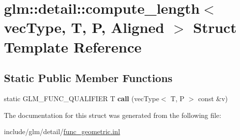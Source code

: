 \hypertarget{structglm_1_1detail_1_1compute__length}{}\section{glm\+:\+:detail\+:\+:compute\+\_\+length$<$ vec\+Type, T, P, Aligned $>$ Struct Template Reference}
\label{structglm_1_1detail_1_1compute__length}
\subsection*{Static Public Member Functions}
\begin{DoxyCompactItemize}
\item 
\mbox{\label{structglm_1_1detail_1_1compute__length_ad708612d3f5e08a063311daa4ee88798}} 
static G\+L\+M\+\_\+\+F\+U\+N\+C\+\_\+\+Q\+U\+A\+L\+I\+F\+I\+ER T {\bfseries call} (vec\+Type$<$ T, P $>$ const \&v)
\end{DoxyCompactItemize}


The documentation for this struct was generated from the following file\+:\begin{DoxyCompactItemize}
\item 
include/glm/detail/\hyperlink{func__geometric_8inl}{func\+\_\+geometric.\+inl}\end{DoxyCompactItemize}
